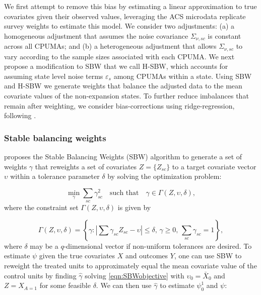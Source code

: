 \documentclass[aoas]{imsart}
\theoremstyle{plain}
\theoremstyle{remark}
\begin{document}
We first attempt to remove this bias by estimating a linear approximation to true covariates given their observed values, leveraging the ACS microdata replicate survey weights to estimate this model. We consider two adjustments: (a) a homogeneous adjustment that assumes the noise covariance $\Sigma_{\nu, sc}$ is constant across all CPUMAs; and (b) a heterogeneous adjustment that allows $\Sigma_{\nu,sc}$ to vary according to the sample sizes associated with each CPUMA. We next propose a modification to SBW that we call H-SBW, which accounts for assuming state level noise terms $\varepsilon_s$ among CPUMAs within a state. Using SBW and H-SBW we generate weights that balance the adjusted data to the mean covariate values of the non-expansion states. To further reduce imbalances that remain after weighting, we consider bias-corrections using ridge-regression, following \cite{ben2021augmented}. 

\subsubsection{Stable balancing weights}\label{ssec:SBW}

\cite{zubizarreta2015stable} proposes the Stable Balancing Weights (SBW) algorithm to generate a set of weights $\gamma$ that reweights a set of covariates $Z = \{Z_{sc}\}$ to a target covariate vector $\upsilon$ within a tolerance parameter $\delta$ by solving the optimization problem:

\begin{equation}\label{eqn:SBWobjective}
 \min_{\gamma} \sum_{sc} \gamma_{sc}^2 \quad \text{such that} \quad \gamma \in \Gamma(Z, \upsilon, \delta),
\end{equation}
%
where the constraint set $\Gamma(Z, \upsilon, \delta)$ is given by

\[ \Gamma(Z, \upsilon, \delta) = \left\{\gamma: \left|\sum \gamma_{sc} Z_{sc}  - \upsilon\right| \leq \delta,\, \gamma \geq 0,\, \sum_{sc} \gamma_{sc} = 1\right\},\]
%
where $\delta$ may be a $q$-dimensional vector if non-uniform tolerances are desired. To estimate $\psi$ given the true covariates $X$ and outcomes $Y$, one can use SBW to reweight the treated units to approximately equal the mean covariate value of the control units by finding $\hat{\gamma}$ solving \eqref{eqn:SBWobjective} with $\upsilon_0 = \bar{X}_0$ and $Z = X_{A=1}$ for some feasible $\delta$. We can then use $\hat{\gamma}$ to estimate $\psi_0^1$ and $\psi$:
\end{document}
